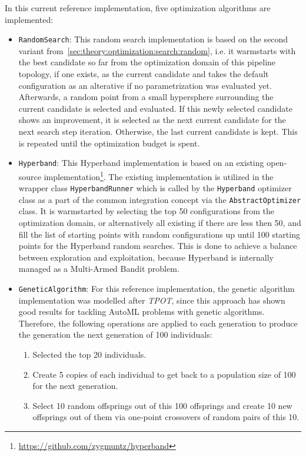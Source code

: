 In this current reference implementation, five optimization algorithms are implemented:
\begin{itemize}
    \item \texttt{RandomSearch}: This random search implementation is based on the second variant from~\ref{sec:theory:optimization:search:random}, i.e. it warmstarts with the best candidate so far from the optimization domain of this pipeline topology, if one exists, as the current candidate and takes the default configuration as an alterative if no parametrization was evaluated yet.
    Afterwards, a random point from a small hypersphere surrounding the current candidate is selected and evaluated.
    If this newly selected candidate shows an improvement, it is selected as the next current candidate for the next search step iteration.
    Otherwise, the last current candidate is kept.
    This is repeated until the optimization budget is spent.
    \item \texttt{Hyperband}: This Hyperband implementation is based on an existing open-source implementation\footnote{\url{https://github.com/zygmuntz/hyperband}}.
    The existing implementation is utilized in the wrapper class \texttt{HyperbandRunner} which is called by the \texttt{Hyperband} optimizer class as a part of the common integration concept via the \texttt{AbstractOptimizer} class.
    It is warmstarted by selecting the top 50 configurations from the optimization domain, or alternatively all existing if there are less then 50, and fill the list of starting points with random configurations up until 100 starting points for the Hyperband random searches.
    This is done to achieve a balance between exploration and exploitation, because Hyperband is internally managed as a Multi-Armed Bandit problem.
    \item \texttt{GeneticAlgorithm}: For this reference implementation, the genetic algorithm implementation was modelled after \textit{TPOT}, since this approach has shown good results for tackling AutoML problems with genetic algorithms.
    Therefore, the following operations are applied to each generation to produce the generation the next generation of 100 individuals:
        \begin{enumerate}
            \item Selected the top 20 individuals.
            \item Create 5 copies of each individual to get back to a population size of 100 for the next generation.
            \item Select 10 random offsprings out of this 100 offsprings and create 10 new offsprings out of them via one-point crossovers of random pairs of this 10.

\end{enumerate}
\end{itemize}
